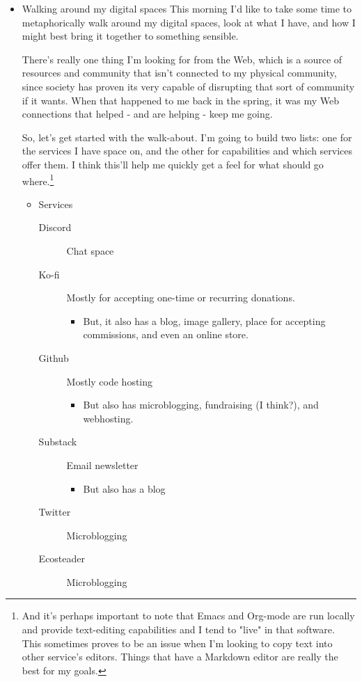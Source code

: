 \documentclass[11pt]{article}
\begin{document}
\begin{itemize}
\item Walking around my digital spaces
\label{sec:orgb798e6d}
This morning I'd like to take some time to metaphorically walk around my digital spaces, look at what I have, and how I might best bring it together to something sensible.

There's really one thing I'm looking for from the Web, which is a source of resources and community that isn't connected to my physical community, since society has proven its very capable of disrupting that sort of community if it wants. When that happened to me back in the spring, it was my Web connections that helped - and are helping - keep me going.

So, let's get started with the walk-about. I'm going to build two lists: one for the services I have space on, and the other for capabilities and which services offer them. I think this'll help me quickly get a feel for what should go where.\footnote{And it's perhaps important to note that Emacs and Org-mode are run locally and provide text-editing capabilities and I tend to "live" in that software. This sometimes proves to be an issue when I'm looking to copy text into other service's editors. Things that have a Markdown editor are really the best for my goals.}
\begin{itemize}
\item Services
\begin{description}
\item[{Discord}] Chat space
\item[{Ko-fi}] Mostly for accepting one-time or recurring donations.
\begin{itemize}
\item But, it also has a blog, image gallery, place for accepting commissions, and even an online store.
\end{itemize}
\item[{Github}] Mostly code hosting
\begin{itemize}
\item But also has microblogging, fundraising (I think?), and webhosting.
\end{itemize}
\item[{Substack}] Email newsletter
\begin{itemize}
\item But also has a blog
\end{itemize}
\item[{Twitter}] Microblogging
\item[{Ecosteader}] Microblogging

\end{description}
\end{itemize}
\end{itemize}
\end{document}
